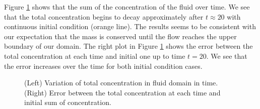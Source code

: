 \par
Figure \ref{fig_sumC} shows that the sum of the concentration of the fluid over time. We see that the total concentration begins to decay approximately after $t \approx 20$ with continuous initial condition (orange line).
The results seems to be consistent with our expectation that the mass is conserved until the flow reaches the upper boundary of our domain. The right plot in Figure \ref{fig_sumC} shows the error between the total concentration at each time and initial one up to time $t = 20$. We see that the error increases over the time for both initial condition cases.  
 \begin{figure}[ht]
 \begin{center}
 \end{center}
 \caption{(Left) Variation of total concentration in fluid domain in time. (Right) Error between the total concentration at each time and initial sum of concentration.}
 \label{fig_sumC}
 \end{figure}

